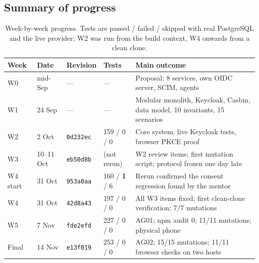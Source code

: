 \subsection{Summary of progress}

\begin{table}[H]
\centering
\small
\begin{tabularx}{\textwidth}{@{}P{1.35cm} P{1.6cm} P{1.6cm} P{1.75cm} L@{}}
\toprule
\textbf{Week} & \textbf{Date} & \textbf{Revision} & \textbf{Tests} & \textbf{Main outcome}\\
\midrule
W0 & mid-Sep & --- & --- & Proposal: 8 services, own OIDC server, SCIM, agents\\
W1 & 24 Sep & --- & --- & Modular monolith, Keycloak, Casbin, data model, 10 invariants, 15 scenarios\\
W2 & 2 Oct & \texttt{0d232ec} & 159 / 0 / 0 & Core system, live Keycloak tests, browser PKCE proof\\
W3 & 10--11 Oct & \texttt{eb50d8b} & (not rerun) & W2 review items; first mutation script; protocol frozen one day late\\
W4 start & 31 Oct & \texttt{953a0aa} & 160 / \textbf{1} / 6 & Rerun confirmed the consent regression found by the mentor\\
W4 & 31 Oct & \texttt{42d8a43} & 197 / 0 / 0 & All W3 items fixed; first clean-clone verification; 7/7 mutations\\
W5 & 7 Nov & \texttt{fde2efd} & 227 / 0 / 0 & AG01; npm audit 0; 11/11 mutations; physical phone\\
Final & 14 Nov & \texttt{e13f019} & 253 / 0 / 0 & AG02; 15/15 mutations; 11/11 browser checks on two hosts\\
\bottomrule
\end{tabularx}
\caption{Week-by-week progress. Tests are passed / failed / skipped with real PostgreSQL and the live provider; W2 was run from the build context, W4 onwards from a clean clone.}
\label{tab:progress}
\end{table}

